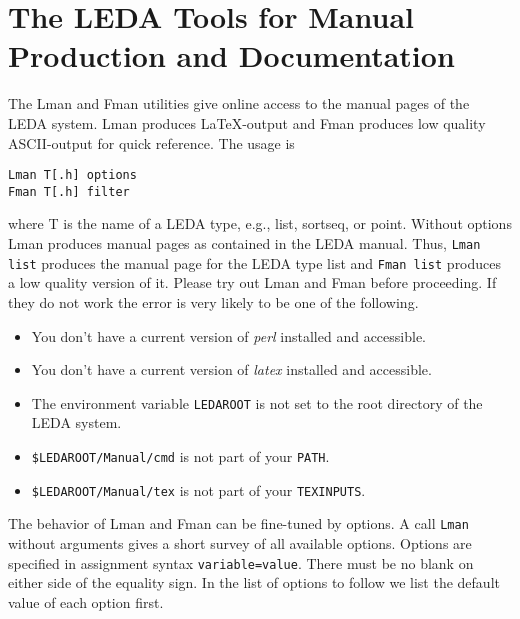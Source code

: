 \section{The LEDA Tools for Manual Production and Documentation}
\label{DocTools}

The Lman and Fman utilities give online access to the manual pages of the LEDA
system.  Lman produces \LaTeX-output and Fman produces low quality ASCII-output
for quick reference. The usage is
\begin{verbatim}
Lman T[.h] options
Fman T[.h] filter
\end{verbatim}
where T is the name of a LEDA type, e.g., list, sortseq, or point. Without
options Lman produces manual pages as contained in the LEDA manual. Thus,
\verb-Lman list- produces the manual page for the LEDA type list and 
\verb-Fman list- produces a low quality version of it.  Please try out Lman 
and Fman before proceeding.  If they do not work the error is very likely 
to be one of the following.

\begin{itemize}
\item You don't have a current version of \emph{perl} installed and accessible.
\item You don't have a current version of \emph{latex} installed and accessible.
\item The environment variable \verb-LEDAROOT- is not set to the root directory of 
the LEDA system.
\item \verb-$LEDAROOT/Manual/cmd- is not part of your \verb-PATH-.
\item \verb-$LEDAROOT/Manual/tex- is not part of your \verb-TEXINPUTS-.
\end{itemize}
\index{\LaTeX}

The behavior of Lman and Fman can be fine-tuned by options. A call
\texttt{Lman} without arguments gives a short survey of all available
options. Options are specified in assignment syntax
\texttt{variable=value}. There must be no blank on either side of the equality
sign. In the list of options to follow we list the default value of each option
first.

